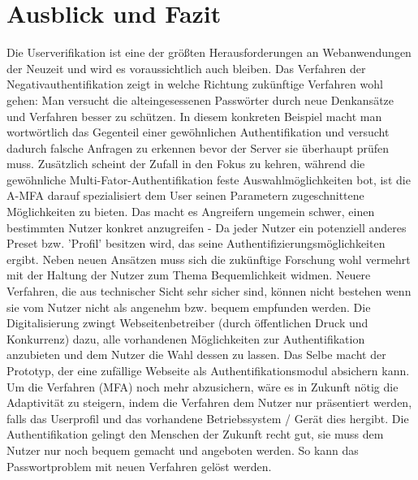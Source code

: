 \chapter{Ausblick und Fazit}
Die Userverifikation ist eine der größten Herausforderungen an Webanwendungen der Neuzeit und wird es voraussichtlich auch bleiben. Das Verfahren der Negativauthentifikation zeigt in welche Richtung zukünftige Verfahren wohl gehen: Man versucht die alteingesessenen Passwörter durch neue Denkansätze und Verfahren besser zu schützen. In diesem konkreten Beispiel macht man wortwörtlich das Gegenteil einer gewöhnlichen Authentifikation und versucht dadurch falsche Anfragen zu erkennen bevor der Server sie überhaupt prüfen muss. Zusätzlich scheint der Zufall in den Fokus zu kehren, während die gewöhnliche Multi-Fator-Authentifikation feste Auswahlmöglichkeiten bot, ist die A-MFA darauf spezialisiert dem User seinen Parametern zugeschnittene Möglichkeiten zu bieten. Das macht es Angreifern ungemein schwer, einen bestimmten Nutzer konkret anzugreifen - Da jeder Nutzer ein potenziell anderes Preset bzw. 'Profil' besitzen wird, das seine Authentifizierungsmöglichkeiten ergibt. Neben neuen Ansätzen muss sich die zukünftige Forschung wohl vermehrt mit der Haltung der Nutzer zum Thema Bequemlichkeit widmen. Neuere Verfahren, die aus technischer Sicht sehr sicher sind, können nicht bestehen wenn sie vom Nutzer nicht als angenehm bzw. bequem empfunden werden. Die Digitalisierung zwingt Webseitenbetreiber (durch öffentlichen Druck und Konkurrenz) dazu, alle vorhandenen Möglichkeiten zur Authentifikation anzubieten und dem Nutzer die Wahl dessen zu lassen. Das Selbe macht der Prototyp, der eine zufällige Webseite als Authentifikationsmodul absichern kann. Um die Verfahren (MFA) noch mehr abzusichern, wäre es in Zukunft nötig die Adaptivität zu steigern, indem die Verfahren dem Nutzer nur präsentiert werden, falls das Userprofil und das vorhandene Betriebssystem / Gerät dies hergibt. Die Authentifikation gelingt den Menschen der Zukunft recht gut, sie muss dem Nutzer nur noch bequem gemacht und angeboten werden. So kann das Passwortproblem mit neuen Verfahren gelöst werden.
